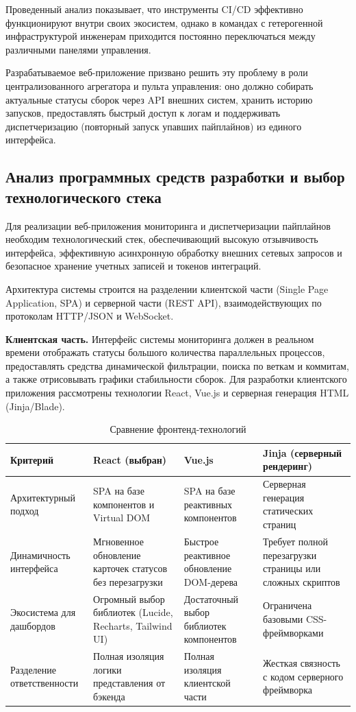 Проведенный анализ показывает, что инструменты CI/CD эффективно функционируют внутри своих экосистем, однако в командах с гетерогенной инфраструктурой инженерам приходится постоянно переключаться между различными панелями управления. 

Разрабатываемое веб-приложение призвано решить эту проблему в роли централизованного агрегатора и пульта управления: оно должно собирать актуальные статусы сборок через API внешних систем, хранить историю запусков, предоставлять быстрый доступ к логам и поддерживать диспетчеризацию (повторный запуск упавших пайплайнов) из единого интерфейса.

\subsection{Анализ программных средств разработки и выбор технологического стека}

Для реализации веб-приложения мониторинга и диспетчеризации пайплайнов необходим технологический стек, обеспечивающий высокую отзывчивость интерфейса, эффективную асинхронную обработку внешних сетевых запросов и безопасное хранение учетных записей и токенов интеграций.

Архитектура системы строится на разделении клиентской части (Single Page Application, SPA) и серверной части (REST API), взаимодействующих по протоколам HTTP/JSON и WebSocket.

\textbf{Клиентская часть.} Интерфейс системы мониторинга должен в реальном времени отображать статусы большого количества параллельных процессов, предоставлять средства динамической фильтрации, поиска по веткам и коммитам, а также отрисовывать графики стабильности сборок. Для разработки клиентского приложения рассмотрены технологии React, Vue.js и серверная генерация HTML (Jinja/Blade).

\begin{table}[H]
    \centering
    \caption{Сравнение фронтенд-технологий}
    \label{tab:frontend_compare}
    \small
    \begin{tabular}{|p{3cm}|p{3.7cm}|p{3.7cm}|p{3.7cm}|}
        \hline
        \textbf{Критерий} & \textbf{React (выбран)} & \textbf{Vue.js} & \textbf{Jinja (серверный рендеринг)} \\ \hline
        Архитектурный подход & SPA на базе компонентов и Virtual DOM~\cite{react_docs} & SPA на базе реактивных компонентов & Серверная генерация статических страниц \\ \hline
        Динамичность интерфейса & Мгновенное обновление карточек статусов без перезагрузки & Быстрое реактивное обновление DOM-дерева & Требует полной перезагрузки страницы или сложных скриптов \\ \hline
        Экосистема для дашбордов & Огромный выбор библиотек (Lucide, Recharts, Tailwind UI) & Достаточный выбор библиотек компонентов & Ограничена базовыми CSS-фреймворками \\ \hline
        Разделение ответственности & Полная изоляция логики представления от бэкенда & Полная изоляция клиентской части & Жесткая связность с кодом серверного фреймворка \\ \hline
    \end{tabular}
\end{table}

